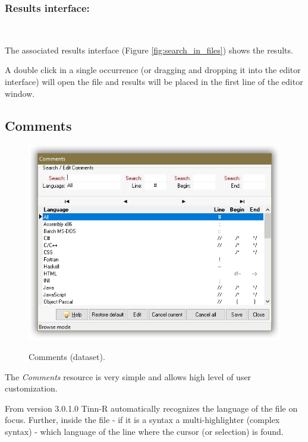 \subsubsection{Results interface:}\\

The associated results interface
(Figure \ref{fig:search_in_files})
shows the results.

A double click in a single occurrence (or dragging and dropping it into the
editor interface) will open the file and results will be placed in the first
line of the editor window.


\hypertarget{dlg_working_about}{}
\subsection{Comments}

\begin{figure}[H]
  \includegraphics[scale=0.35]{./res/dlg_comments.png}\\
  \caption{Comments (dataset).}
  \label{fig:dlg_comments}
\end{figure}
The \textit{Comments} resource is very simple and allows high level
of user customization.

From version 3.0.1.0 Tinn-R automatically recognizes the
language of the file on focus. Further, inside the file
- if it is a syntax a multi-highlighter (complex syntax) - which language of
the line where the cursor (or selection) is found.

